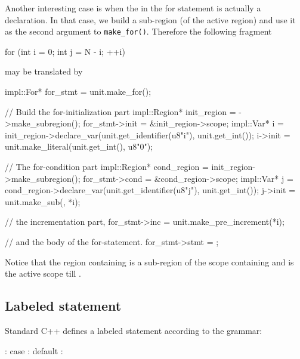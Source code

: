 \documentclass[11pt]{article}
\begin{document}
Another interesting case is when the  in the for statement
is actually a declaration.  In that case, we build a sub-region (of the active
region) and use it as the second argument to \texttt{make\_for()}. Therefore
the following fragment
\begin{Program}
  for (int i = 0; int j = N - i; ++i)
\end{Program}
may be translated by
\begin{Program}
  impl::For* for_stmt = unit.make_for();

  // Build the for-initialization part
  impl::Region* init_region = ->make_subregion();
  for_stmt->init = &init_region->scope;
  impl::Var* i = init_region->declare_var(unit.get_identifier(u8"i"),
                                          unit.get_int());
  i->init = unit.make_literal(unit.get_int(), u8"0");

  // The for-condition part
  impl::Region* cond_region = init_region->make_subregion();
  for_stmt->cond = &cond_region->scope;
  impl::Var* j = cond_region->declare_var(unit.get_identifier(u8"j"),
                                          unit.get_int());
  j->init = unit.make_sub(, *i);

  // the incrementation part,
  for_stmt->inc = unit.make_pre_increment(*i);

  // and the body of the for-statement.
  for_stmt->stmt = ;
\end{Program}
Notice that the region containing  is a sub-region of the scope
containing  and is the active scope till .


\subsection{Labeled statement}
\label{sec:stmt.labeled}

Standard C++ defines a labeled statement according to the grammar:
\begin{Grammar}
       : 
      case  : 
      default : 
\end{Grammar}
\end{document}
